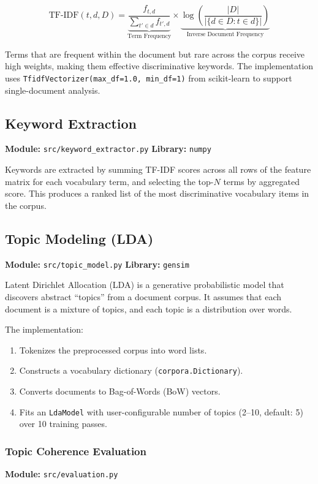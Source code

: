 \documentclass[12pt, a4paper]{article}
\begin{document}
\begin{equation}
  \text{TF-IDF}(t, d, D) = \underbrace{\frac{f_{t,d}}{\sum_{t' \in d} f_{t',d}}}_{\text{Term Frequency}} \times \underbrace{\log\left(\frac{|D|}{|\{d \in D : t \in d\}|}\right)}_{\text{Inverse Document Frequency}}
\end{equation}

Terms that are frequent within the document but rare across the corpus receive high weights, making them effective discriminative keywords. The implementation uses \texttt{TfidfVectorizer(max\_df=1.0, min\_df=1)} from scikit-learn to support single-document analysis.

\subsection{Keyword Extraction}
\textbf{Module:} \texttt{src/keyword\_extractor.py} \quad \textbf{Library:} \texttt{numpy}

Keywords are extracted by summing TF-IDF scores across all rows of the feature matrix for each vocabulary term, and selecting the top-$N$ terms by aggregated score. This produces a ranked list of the most discriminative vocabulary items in the corpus.

\subsection{Topic Modeling (LDA)}
\textbf{Module:} \texttt{src/topic\_model.py} \quad \textbf{Library:} \texttt{gensim}

Latent Dirichlet Allocation (LDA) is a generative probabilistic model that discovers abstract ``topics'' from a document corpus. It assumes that each document is a mixture of topics, and each topic is a distribution over words.

The implementation:
\begin{enumerate}
  \item Tokenizes the preprocessed corpus into word lists.
  \item Constructs a vocabulary dictionary (\texttt{corpora.Dictionary}).
  \item Converts documents to Bag-of-Words (BoW) vectors.
  \item Fits an \texttt{LdaModel} with user-configurable number of topics (2--10, default: 5) over 10 training passes.
\end{enumerate}

\subsubsection{Topic Coherence Evaluation}
\textbf{Module:} \texttt{src/evaluation.py}
\end{document}
